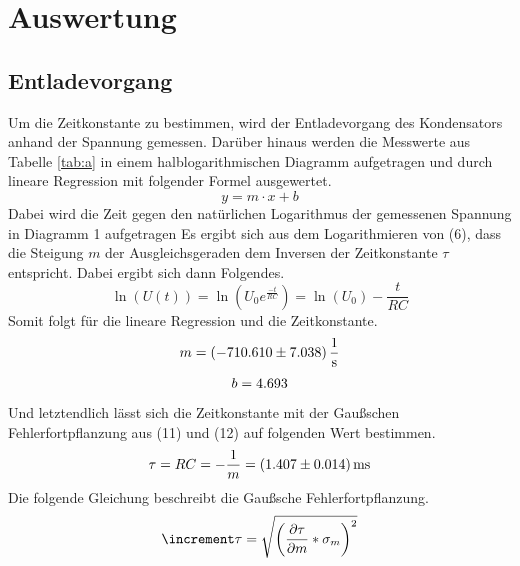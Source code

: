 \section{Auswertung}
\subsection{Entladevorgang}
Um die Zeitkonstante \tau zu bestimmen, wird der Entladevorgang des Kondensators anhand der Spannung gemessen.
Darüber hinaus werden die Messwerte aus Tabelle \ref{tab:a} in einem halblogarithmischen Diagramm aufgetragen und durch lineare Regression mit folgender Formel ausgewertet.
\begin{equation}
    y = m \cdot x +b
\end{equation}
Dabei wird die Zeit gegen den natürlichen Logarithmus der gemessenen Spannung in Diagramm 1 aufgetragen
Es ergibt sich aus dem Logarithmieren von (6), dass die Steigung $m$ der Ausgleichsgeraden dem Inversen der Zeitkonstante $\tau$ entspricht.
Dabei ergibt sich dann Folgendes.
\begin{equation}
    \ln(U(t)) = \ln(U_0 e^{\frac{-t}{RC}}) = \ln(U_0) - \frac{t}{RC}
\end{equation}
Somit folgt für die lineare Regression und die Zeitkonstante.
\begin{align}
    m  =  \SI{-710.610 \pm 7.038}{\frac{1}{s}} \notag
\end{align}
\begin{equation}
    b = 4.693 \notag
\end{equation}
Und letztendlich lässt sich die Zeitkonstante mit der Gaußschen Fehlerfortpflanzung aus (11) und (12) auf folgenden Wert bestimmen.
\begin{equation}
    \tau = RC = - \frac{1}{m} = \SI{1,407 \pm 0,014}{ms} \notag
\end{equation}
Die folgende Gleichung beschreibt die Gaußsche Fehlerfortpflanzung.
\begin{equation}
    \increment \tau = \sqrt{\left (\frac{\partial \tau}{\partial m} * \sigma_{m} \right )^2}	\notag
\end{equation}


